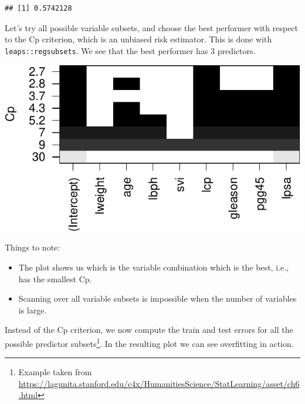 \documentclass[]{book}
\newenvironment{Shaded}{\begin{snugshade}}{\end{snugshade}}
\newcommand{\CommentTok}[1]{\textcolor[rgb]{0.56,0.35,0.01}{\textit{#1}}}
\newcommand{\DataTypeTok}[1]{\textcolor[rgb]{0.13,0.29,0.53}{#1}}
\newcommand{\KeywordTok}[1]{\textcolor[rgb]{0.13,0.29,0.53}{\textbf{#1}}}
\newcommand{\NormalTok}[1]{#1}
\newcommand{\OperatorTok}[1]{\textcolor[rgb]{0.81,0.36,0.00}{\textbf{#1}}}
\newcommand{\StringTok}[1]{\textcolor[rgb]{0.31,0.60,0.02}{#1}}
\providecommand{\tightlist}{%
  \setlength{\itemsep}{0pt}\setlength{\parskip}{0pt}}
\theoremstyle{definition}
\theoremstyle{definition}
\theoremstyle{definition}
\theoremstyle{remark}
\begin{document}
\begin{verbatim}
## [1] 0.5742128
\end{verbatim}

Let's try all possible variable subsets, and choose the best performer with respect to the Cp criterion, which is an unbiased risk estimator.
This is done with \texttt{leaps::regsubsets}.
We see that the best performer has 3 predictors.

\begin{Shaded}
\end{Shaded}

\includegraphics[width=0.5\linewidth]{Rcourse_files/figure-latex/all subset-1}

Things to note:

\begin{itemize}
\tightlist
\item
  The plot shows us which is the variable combination which is the best, i.e., has the smallest Cp.
\item
  Scanning over all variable subsets is impossible when the number of variables is large.
\end{itemize}

Instead of the Cp criterion, we now compute the train and test errors for all the possible predictor subsets\footnote{Example taken from \url{https://lagunita.stanford.edu/c4x/HumanitiesScience/StatLearning/asset/ch6.html}}.
In the resulting plot we can see overfitting in action.
\end{document}
